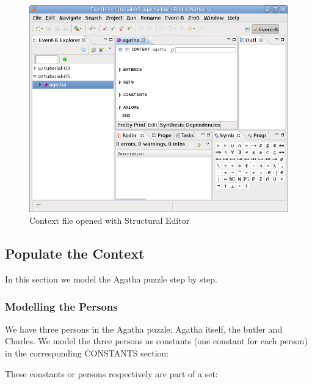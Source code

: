 \begin{figure}[!h]
\begin{center}
	\includegraphics{img/tutorial/tut_05_agatha2.png}
	\caption{Context file opened with Structural Editor}
	\label{fig_tut_05_context_file}
\end{center}
\end{figure}

\subsection{Populate the Context}

In this section we model the Agatha puzzle step by step.

\subsubsection{Modelling the Persons}
\label{tut_modelling_the_persons}

We have three persons in the Agatha puzzle: Agatha itself, the butler and Charles. We model the three persons as constants (one constant for each person) in the corresponding \textsf{CONSTANTS} section:


These constants or persons respectively are part of a set:

